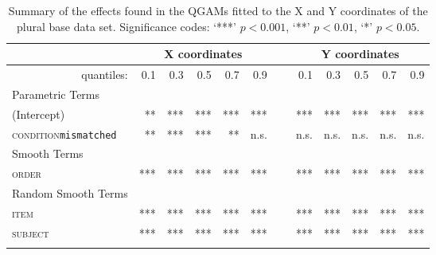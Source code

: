 \begin{table}\fontsize{9}{10}
\caption{Summary of the effects found in the QGAMs fitted to the X and Y coordinates of the plural base data set. Significance codes: `***' $p < 0.001$, `**' $p < 0.01$, `*' $p < 0.05$.}
\label{tab:7.12}
\centering
\begin{tabular}{lrrrrrrrrrrr}
\lsptoprule
~                   & \multicolumn{5}{c}{X coordinates}       & \multicolumn{1}{c}{}                        & \multicolumn{5}{c}{Y coordinates}                               \\
\midrule
\multicolumn{1}{r}{quantiles:}          & 0.1        & 0.3        & 0.5        & 0.7        & 0.9  & ~       & 0.1        & 0.3        & 0.5        & 0.7        & 0.9         \\
\midrule
Parametric Terms    & \textbf{~} & \textbf{~} & \textbf{~} & \textbf{~} & \textbf{~} & \textbf{~} & \textbf{~} & \textbf{~} & \textbf{~} & \textbf{~}  \\
\midrule
(Intercept)         & **        & ***        & ***        & ***        & *** & ~       & ***        & ***        & ***        & ***        & ***          \\
\textsc{condition}\texttt{mismatched} & **       & ***          & ***        & **        & n.s.  & ~      & n.s.       & n.s.        & n.s.        & n.s.        & n.s.         \\
\midrule
Smooth Terms        & \textbf{~} & \textbf{~} & \textbf{~} & \textbf{~} & \textbf{~} & \textbf{~} & \textbf{~} & \textbf{~} & \textbf{~} & \textbf{~}  \\
\midrule
\textsc{order}               & ***        & ***        & ***        & ***        & *** & ~       & ***        & ***        & ***        & ***        & ***         \\
\midrule
Random Smooth Terms & \textbf{~} & \textbf{~} & \textbf{~} & \textbf{~} & \textbf{~} & \textbf{~} & \textbf{~} & \textbf{~} & \textbf{~} & \textbf{~}  \\
\midrule
\textsc{item}                & ***        & ***        & ***        & ***        & ***  & ~      & ***        & ***        & ***        & ***        & ***         \\
\textsc{subject}             & ***        & ***        & ***        & ***        & ***  & ~      & ***        & ***        & ***        & ***        & ***        \\
\lspbottomrule
\end{tabular}
\end{table}

